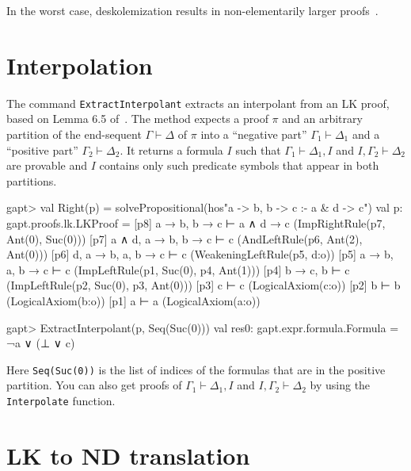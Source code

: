 \documentclass[a4paper,11pt]{book}
\newcommand{\seq}{\vdash}	%
\begin{document}
In the worst case, deskolemization results in non-elementarily larger
proofs~\cite{Aguilera2016Unsound}.

\section{Interpolation}

The command \texttt{ExtractInterpolant} extracts an interpolant from an LK
proof, based on Lemma 6.5 of~\cite{Takeuti87Proof}.  The method expects a proof
$\pi$ and an arbitrary partition of the end-sequent $\Gamma \seq \Delta$ of
$\pi$ into a ``negative part'' $\Gamma_1\seq\Delta_1$ and a ``positive part''
$\Gamma_2 \seq \Delta_2$.  It returns a formula $I$ such that
$\Gamma_1\seq\Delta_1, I$ and $I,\Gamma_2\seq\Delta_2$ are provable and $I$
contains only such predicate symbols that appear in both partitions.

\begin{clilisting}
gapt> val Right(p) = solvePropositional(hos"a -> b, b -> c :- a & d -> c")
val p: gapt.proofs.lk.LKProof =
[p8] a → b, b → c ⊢ a ∧ d → c    (ImpRightRule(p7, Ant(0), Suc(0)))
[p7] a ∧ d, a → b, b → c ⊢ c    (AndLeftRule(p6, Ant(2), Ant(0)))
[p6] d, a → b, a, b → c ⊢ c    (WeakeningLeftRule(p5, d:o))
[p5] a → b, a, b → c ⊢ c    (ImpLeftRule(p1, Suc(0), p4, Ant(1)))
[p4] b → c, b ⊢ c    (ImpLeftRule(p2, Suc(0), p3, Ant(0)))
[p3] c ⊢ c    (LogicalAxiom(c:o))
[p2] b ⊢ b    (LogicalAxiom(b:o))
[p1] a ⊢ a    (LogicalAxiom(a:o))

gapt> ExtractInterpolant(p, Seq(Suc(0)))
val res0: gapt.expr.formula.Formula = ¬a ∨ (⊥ ∨ c)

\end{clilisting}

Here \texttt{Seq(Suc(0))} is the list of indices of the formulas that are in
the positive partition.  You can also get proofs of $\Gamma_1 \vdash \Delta_1,
I$ and $I, \Gamma_2 \vdash \Delta_2$ by using the \texttt{Interpolate}
function.

\section{LK to ND translation}
\end{document}
